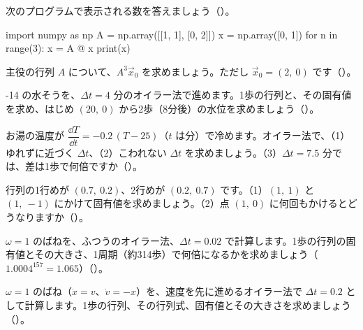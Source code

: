 \bkproblem 次のプログラムで表示される数を答えましょう\mbox{（）}。\par\nobreak\vspace{2pt}
\noindent\hfill\begin{minipage}[c]{0.7\linewidth}
\begin{bkcode}[Python]
import numpy as np
A = np.array([[1, 1], [0, 2]])
x = np.array([0, 1])
for n in range(3):
    x = A @ x
    print(x)
\end{bkcode}
\end{minipage}\par
{}

\bkproblem 主役の行列 $A$ について、$A^3\vec x_0$ を求めましょう。ただし $\vec x_0=(2,\ 0)$ です\mbox{（）}。

-14 の水そうを、$\Delta t=4$ 分のオイラー法で進めます。1歩の行列と、その固有値を求め、はじめ $(20,\ 0)$ から2歩（8分後）の水位を求めましょう\mbox{（）}。

\bkproblem お湯の温度が $\dfrac{\dd T}{\dd t}=-0.2\,(T-25)$（$t$ は分）で冷めます。オイラー法で、（1）ゆれずに近づく $\Delta t$、（2）こわれない $\Delta t$ を求めましょう。（3）$\Delta t=7.5$ 分では、差は1歩で何倍ですか\mbox{（）}。


\bkproblem 行列の1行めが $(0.7,\ 0.2)$、2行めが $(0.2,\ 0.7)$ です。（1）$(1,\ 1)$ と $(1,\ -1)$ にかけて固有値を求めましょう。（2）点 $(1,\ 0)$ に何回もかけるとどうなりますか\mbox{（）}。

\bkproblem $\omega=1$ のばねを、ふつうのオイラー法、$\Delta t=0.02$ で計算します。1歩の行列の固有値とその大きさ、1周期（約314歩）で何倍になるかを求めましょう（$1.0004^{157}=1.065$）\mbox{（）}。

\bkproblem $\omega=1$ のばね（$\dot x=v$、$\dot v=-x$）を、速度を先に進めるオイラー法で $\Delta t=0.2$ として計算します。1歩の行列、その行列式、固有値とその大きさを求めましょう\mbox{（）}。


